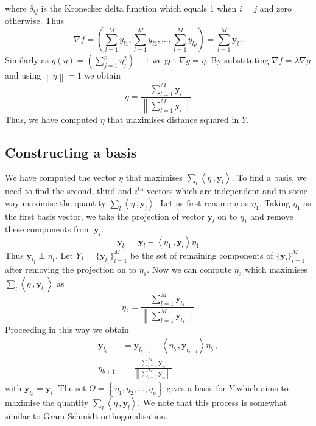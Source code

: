 \documentclass[11pt]{article}
\begin{document}
where $\delta_{ij}$ is the Kronecker delta function which equals 1 when $i=j$ and zero otherwise. Thus
\begin{equation}\label{eq:secMF8}
    \nabla f = \left(\sum_{l=1}^M y_{l1}, \sum_{l=1}^M y_{l2}, \ldots, \sum_{l=1}^M y_{lp}   \right) = \sum_{l=1}^M \bm{y}_l \, .
\end{equation}
Similarly as $g(\eta) = \left( \sum_{j=1}^p \eta_j^2\right) - 1$  we get $\nabla g = \eta$. By substituting  $\nabla f = \lambda \nabla g$ and using $\left\lVert \eta \right\rVert = 1 $ we obtain
\begin{equation}\label{eq:secMF9}
    \eta = \frac{\sum_{l=1}^M \bm{y}_l }{  \left\lVert\sum_{l=1}^M \bm{y}_l  \right\rVert  }
\end{equation}
Thus, we have computed $\eta$ that maximises distance squared in $Y$.  

\subsection{Constructing a basis}\label{sec:MathFrame3}
We have computed the vector $\eta$ that maximises $\sum_{l}\left\langle \eta\, ,  \bm{y}_{l} \right\rangle$. To find a basis,  we need to find the second, third and $i^{\text{th}}$ vectors which are independent and in some way maximise the quantity $\sum_{l}\left\langle \eta\, ,  \bm{y}_{l} \right\rangle$.  Let us first rename $\eta$ as $\eta_1$. Taking $\eta_1$ as the first basis vector, we take the projection of vector $\bm{y}_l$ on to $\eta_1$  and remove these components from $\bm{y}_l$. 
\begin{equation}\label{eq:secMF10}
    \bm{y}_{l_1} = \bm{y}_l - \left\langle \eta_1 \, , \bm{y}_l \right \rangle \eta_1
\end{equation}
Thus $\bm{y}_{l_1} \perp \eta_1$. Let $Y_1 = \{\bm{y}_{l_1} \}_{l=1}^M $ be the set of remaining components of $\{ \bm{y}_l \}_{l=1}^M$ after removing the projection on to $\eta_1$. Now we can compute $\eta_2$ which maximises $\sum_{l}\left\langle \eta\, ,  \bm{y}_{l_1} \right\rangle$ as
\begin{equation}\label{eq:secMF11}
    \eta_2 = \frac{\sum_{l=1}^M \bm{y}_{l_1} }{  \left\lVert\sum_{l=1}^M \bm{y}_{l_1}  \right\rVert  } 
\end{equation}
Proceeding in this way we obtain 
\begin{align}
    \bm{y}_{l_{b}} & = \bm{y}_{l_{b-1}} - \left\langle \eta_b \, , \bm{y}_{l_{b-1}} \right \rangle \eta_b \, , \label{eq:secMF12} \\
     \eta_{b+1} & = \frac{\sum_{l=1}^M \bm{y}_{l_b} }{  \left\lVert\sum_{l=1}^M \bm{y}_{l_b}  \right\rVert  } \label{eq:secMF13}
\end{align}
with $\bm{y}_{l_0} = \bm{y}_{l}$. The set $\Theta = \left\{ \eta_1, \eta_2, \ldots , \eta_p  \right\}$ gives a basis for $Y$ which aims to maximise the quantity $\sum_{l}\left\langle \eta\, ,  \bm{y}_{l} \right\rangle$.  We note that this process is somewhat similar to Gram Schmidt orthogonalisation.  \\
\end{document}
